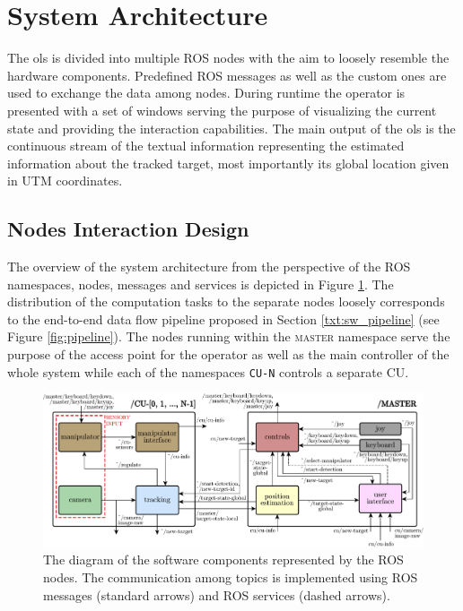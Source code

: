 \section{System Architecture} \label{txt:system_architecture}

The \gls{ols} is divided into multiple ROS nodes with the aim to loosely resemble the hardware components. Predefined ROS messages as well as the custom ones are used to exchange the data among nodes. During runtime the operator is presented with a set of windows serving the purpose of visualizing the current state and providing the interaction capabilities. The main output of the \gls{ols} is the continuous stream of the textual information representing the estimated information about the tracked target, most importantly its global location given in UTM coordinates.

\subsection{Nodes Interaction Design} \label{txt:nodes_interaction_design}

 
The overview of the system architecture from the perspective of the ROS namespaces, nodes, messages and services is depicted in Figure \ref{fig:sw_ols}. The distribution of the computation tasks to the separate nodes loosely corresponds to the end-to-end data flow pipeline proposed in Section \ref{txt:sw_pipeline} (see Figure \ref{fig:pipeline}). The nodes running within the \textsc{master} namespace serve the purpose of the access point for the operator as well as the main controller of the whole system while each of the namespaces \texttt{CU-N} controls a separate CU.

\begin{figure}[htb]
	\centering
	\includegraphics[width=0.98\linewidth]{fig/sw_ols.pdf}
	\caption{The diagram of the software components represented by the ROS nodes. The communication among topics is implemented using ROS messages (standard arrows) and ROS services (dashed arrows).}
	\label{fig:sw_ols}
\end{figure}

